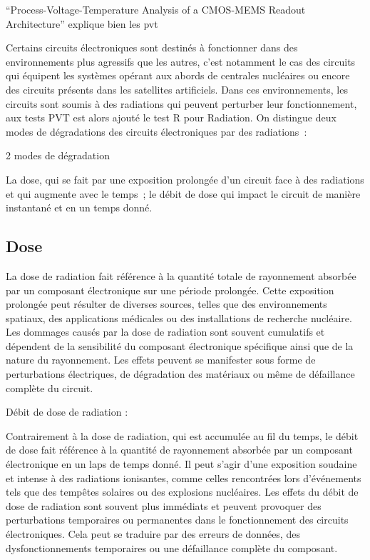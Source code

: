 \begin{metsUneSource}
“Process-Voltage-Temperature Analysis of a CMOS-MEMS Readout Architecture” explique bien les pvt
\end{metsUneSource}

Certains circuits électroniques sont destinés à fonctionner dans des environnements plus agressifs que les autres, c’est notamment le cas des circuits qui équipent les systèmes opérant aux abords de centrales nucléaires ou encore des circuits présents dans les satellites artificiels. Dans ces environnements, les circuits sont soumis à des radiations qui peuvent perturber leur fonctionnement, aux tests PVT est alors ajouté le test R pour Radiation.
On distingue deux modes de dégradations des circuits électroniques par des radiations :

\begin{metsUneSource}
  2 modes de dégradation
\end{metsUneSource}

La dose, qui se fait par une exposition prolongée d’un circuit face à des radiations et qui augmente avec le temps ; le débit de dose qui impact le circuit de manière instantané et en un temps donné.

\subsection{Dose}

La dose de radiation fait référence à la quantité totale de rayonnement absorbée par un composant électronique sur une période prolongée. Cette exposition prolongée peut résulter de diverses sources, telles que des environnements spatiaux, des applications médicales ou des installations de recherche nucléaire. Les dommages causés par la dose de radiation sont souvent cumulatifs et dépendent de la sensibilité du composant électronique spécifique ainsi que de la nature du rayonnement. Les effets peuvent se manifester sous forme de perturbations électriques, de dégradation des matériaux ou même de défaillance complète du circuit.

\begin{metsUneSource}
Débit de dose de radiation :
\end{metsUneSource}

Contrairement à la dose de radiation, qui est accumulée au fil du temps, le débit de dose fait référence à la quantité de rayonnement absorbée par un composant électronique en un laps de temps donné. Il peut s'agir d'une exposition soudaine et intense à des radiations ionisantes, comme celles rencontrées lors d'événements tels que des tempêtes solaires ou des explosions nucléaires.
Les effets du débit de dose de radiation sont souvent plus immédiats et peuvent provoquer des perturbations temporaires ou permanentes dans le fonctionnement des circuits électroniques. Cela peut se traduire par des erreurs de données, des dysfonctionnements temporaires ou une défaillance complète du composant.

